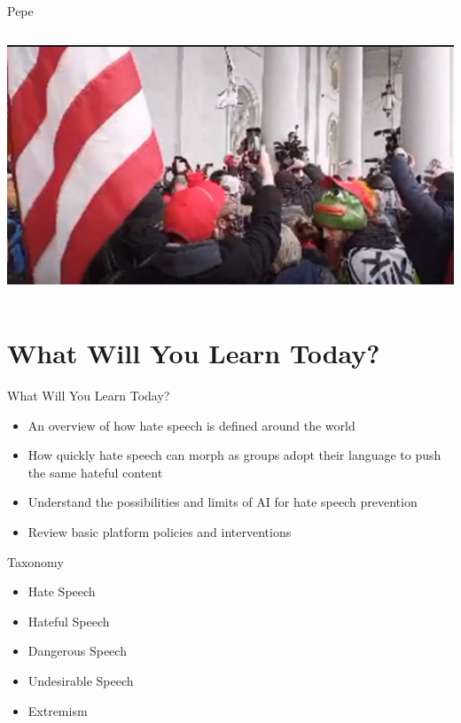 \documentclass[nobackground,dvipsnames,table,aspectratio=169]{beamer}
\begin{document}
\begin{frame}{Pepe}
\begin{columns}
            \includegraphics[width=\textwidth]{pepe-jan-6}
    \end{columns}
\end{frame}

\section{What Will You Learn Today?}

\begin{frame}{What Will You Learn Today?}
    \large
    \begin{itemize}
        \item An overview of how hate speech is defined around the world
        \item How quickly hate speech can morph as groups adopt their language to push the same hateful content
        \item Understand the possibilities and limits of AI for hate speech prevention
        \item Review basic platform policies and interventions
    \end{itemize}
\end{frame}

\begin{frame}{Taxonomy}
    \large
    \begin{itemize}
        \item Hate Speech
        \item Hateful Speech
        \item Dangerous Speech
        \item Undesirable Speech
        \item Extremism
    \end{itemize}
\end{frame}
\end{document}
